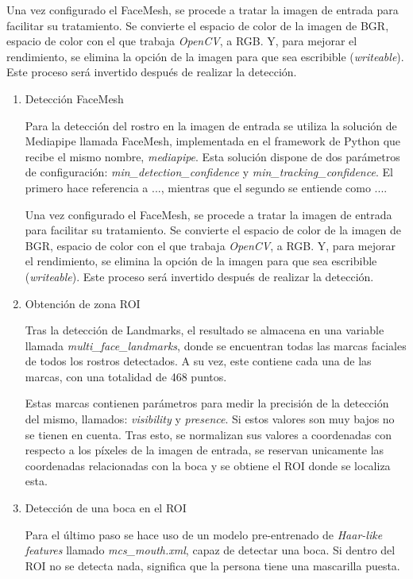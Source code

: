 Una vez configurado el FaceMesh, se procede a tratar la imagen de entrada para facilitar su tratamiento. Se convierte el espacio de color de la imagen de BGR, espacio de color con el que trabaja \textit{OpenCV}, a RGB. Y, para mejorar el rendimiento, se elimina la opción de la imagen para que sea escribible (\textit{writeable}). Este proceso será invertido después de realizar la detección.

\begin{enumerate}
	\item Detección FaceMesh
	
	Para la detección del rostro en la imagen de entrada se utiliza la solución de Mediapipe llamada FaceMesh, implementada en el framework de Python que recibe el mismo nombre, \textit{mediapipe}. Esta solución dispone de dos parámetros de configuración: \textit{min\_detection\_confidence} y \textit{min\_tracking\_confidence}. El primero hace referencia a ..., mientras que el segundo se entiende como ....
	
	Una vez configurado el FaceMesh, se procede a tratar la imagen de entrada para facilitar su tratamiento. Se convierte el espacio de color de la imagen de BGR, espacio de color con el que trabaja \textit{OpenCV}, a RGB. Y, para mejorar el rendimiento, se elimina la opción de la imagen para que sea escribible (\textit{writeable}). Este proceso será invertido después de realizar la detección.
	
	\item Obtención de zona ROI
	
	Tras la detección de Landmarks, el resultado se almacena en una variable llamada \textit{multi\_face\_landmarks}, donde se encuentran todas las marcas faciales de todos los rostros detectados. A su vez, este contiene cada una de las marcas, con una totalidad de 468 puntos.

	Estas marcas contienen parámetros para medir la precisión de la detección del mismo, llamados: \textit{visibility} y \textit{presence}. Si estos valores son muy bajos no se tienen en cuenta. Tras esto, se normalizan sus valores a coordenadas con respecto a los píxeles de la imagen de entrada, se reservan unicamente las coordenadas relacionadas con la boca y se obtiene el ROI donde se localiza esta.
	
	\item Detección de una boca en el ROI 
	
	Para el último paso se hace uso de un modelo pre-entrenado de \textit{Haar-like features} llamado \textit{mcs\_mouth.xml}, capaz de detectar una boca. Si dentro del ROI no se detecta nada, significa que la persona tiene una mascarilla puesta.
\end{enumerate}


